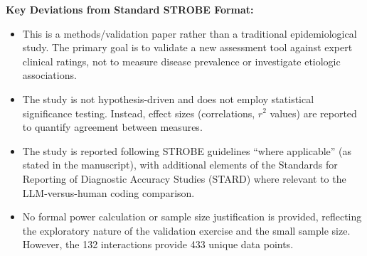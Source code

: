 \documentclass{article}
\begin{document}
\noindent \textbf{Key Deviations from Standard STROBE Format:}
\begin{itemize}
\item This is a methods/validation paper rather than a traditional epidemiological study. The primary goal is to validate a new assessment tool against expert clinical ratings, not to measure disease prevalence or investigate etiologic associations.
\item The study is not hypothesis-driven and does not employ statistical significance testing. Instead, effect sizes (correlations, $r^{2}$ values) are reported to quantify agreement between measures.
\item The study is reported following STROBE guidelines ``where applicable'' (as stated in the manuscript), with additional elements of the Standards for Reporting of Diagnostic Accuracy Studies (STARD) where relevant to the LLM-versus-human coding comparison.
\item No formal power calculation or sample size justification is provided, reflecting the exploratory nature of the validation exercise and the small sample size. However, the 132 interactions provide 433 unique data points.
\end{itemize}
\end{document}
